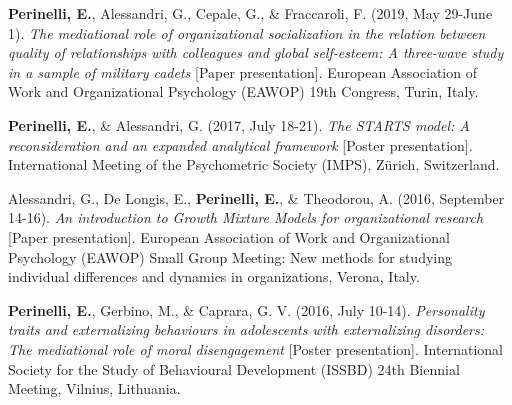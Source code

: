 \documentclass[hidelinks, letterpaper,10pt]{article} %
\begin{document}
\begin{etaremune}
    \item \textbf{Perinelli, E.}, Alessandri, G., Cepale, G., \& Fraccaroli, F. (2019, May 29-June 1). \textit{The mediational role of organizational socialization in the relation between quality of relationships with colleagues and global self-esteem: A three-wave study in a sample of military cadets} [Paper presentation]. European Association of Work and Organizational Psychology (EAWOP) 19th Congress, Turin, Italy.

    \item \textbf{Perinelli, E.}, \& Alessandri, G. (2017, July 18-21). \textit{The STARTS model: A reconsideration and an expanded analytical framework} [Poster presentation]. International Meeting of the Psychometric Society (IMPS), Zürich, Switzerland.

    \item Alessandri, G., De Longis, E., \textbf{Perinelli, E.}, \& Theodorou, A. (2016, September 14-16). \textit{An introduction to Growth Mixture Models for organizational research} [Paper presentation]. European Association of Work and Organizational Psychology (EAWOP) Small Group Meeting: New methods for studying individual differences and dynamics in organizations, Verona, Italy.

    \item \textbf{Perinelli, E.}, Gerbino, M., \& Caprara, G. V. (2016, July 10-14). \textit{Personality traits and externalizing behaviours in adolescents with externalizing disorders: The mediational role of moral disengagement} [Poster presentation]. International Society for the Study of Behavioural Development (ISSBD) 24th Biennial Meeting, Vilnius, Lithuania.
\end{etaremune}
\vspace{3mm}
\end{document}

